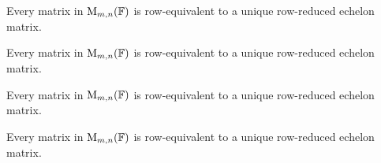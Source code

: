 \begin{lemma}
    Every matrix in $\mathrm{M}_{m,n}(\mathbb{F})$ is row-equivalent to a unique row-reduced echelon matrix.
\end{lemma}

\begin{corollary}
    Every matrix in $\mathrm{M}_{m,n}(\mathbb{F})$ is row-equivalent to a unique row-reduced echelon matrix.
\end{corollary}

\begin{example}
    Every matrix in $\mathrm{M}_{m,n}(\mathbb{F})$ is row-equivalent to a unique row-reduced echelon matrix.
\end{example}

\begin{remark}
    Every matrix in $\mathrm{M}_{m,n}(\mathbb{F})$ is row-equivalent to a unique row-reduced echelon matrix.
\end{remark}